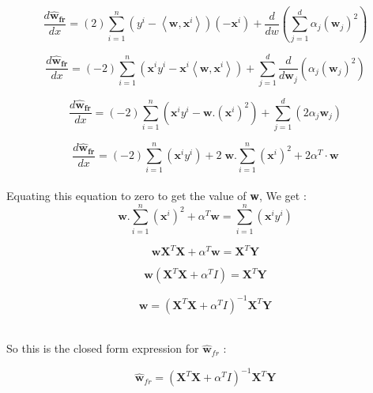 \documentclass[a4paper,11pt]{article}
\begin{document}
\begin{mlsolution}
\[
\frac{ d\widehat{\textbf{w}}_{\textbf{fr}} }{dx} = \left ( 2 \right ) \sum_{i = 1}^{n}\left ( y^{i} - \left \langle \textbf{w}, \textbf{x}^{i} \right \rangle \right )\left ( - \textbf{x}^{i} \right ) + \frac{d}{dw} (\sum_{j = 1}^{d} \alpha_{j}\left ( \textbf{w}_{j} \right )^{2})
\]

\[
\frac{ d\widehat{\textbf{w}}_{\textbf{fr}} }{dx} = \left ( -2 \right ) \sum_{i = 1}^{n}\left ( \textbf{x}^{i}y^{i} - \textbf{x}^{i}\left \langle \textbf{w}, \textbf{x}^{i} \right \rangle \right  ) + \sum_{j = 1}^{d} \frac{d}{d\textbf{w}_{j}} (\alpha_{j}\left ( \textbf{w}_{j} \right )^{2})
\]

\[
\frac{ d\widehat{\textbf{w}}_{\textbf{fr}} }{dx} = \left ( -2 \right ) \sum_{i = 1}^{n}\left ( \textbf{x}^{i}y^{i} - \textbf{w}. (\textbf{x}^{i})^{2} \right  ) + \sum_{j = 1}^{d} (2\alpha_{j}\textbf{w}_{j})
\]

\[
\frac{ d\widehat{\textbf{w}}_{\textbf{fr}} }{dx} = \left ( -2 \right ) \sum_{i = 1}^{n}\left ( \textbf{x}^{i}y^{i} \right  )  + 2 \; \textbf{w}.\sum_{i=1}^{n} (\textbf{x}^{i})^{2} + 2 \alpha^{T}\cdot\textbf{w}
\]\\ Equating this equation to zero to get the value of \textbf{w}, We get :\\

\[
\textbf{w}.\sum_{i=1}^{n} (\textbf{x}^{i})^{2} + \alpha^{T}\textbf{w} = \sum_{i = 1}^{n}\left ( \textbf{x}^{i}y^{i} \right  ) 
\]

\[
\textbf{w}\textbf{X}^{T}\textbf{X} + \alpha^{T}\textbf{w} = \textbf{X}^{T}\textbf{Y}
\]

\[
\textbf{w}\left ( \textbf{X}^{T}\textbf{X} + \alpha^{T}I \right ) = \textbf{X}^{T}\textbf{Y}\]

\[
\textbf{w} = \left ( \textbf{X}^{T}\textbf{X} + \alpha^{T}I \right )^{-1} \textbf{X}^{T}\textbf{Y}
\]

\\So this is the closed form expression for \begin{math}\widehat{\textbf{w}}_{fr}\end{math} :

\[
\widehat{\textbf{w}}_{fr} = \left ( \textbf{X}^{T}\textbf{X} + \alpha^{T}I \right )^{-1} \textbf{X}^{T}\textbf{Y}
\]\\

\end{mlsolution}
\end{document}
